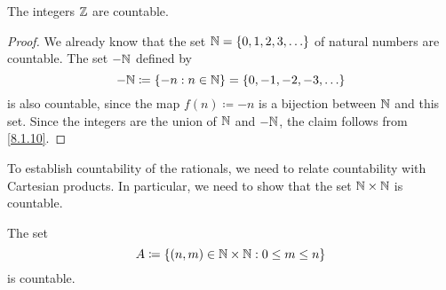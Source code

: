 \begin{cor}\label{8.1.11}
  The integers \(\mathbb{Z}\) are countable.
\end{cor}

\begin{proof}
  We already know that the set \(\N = \set{0, 1, 2, 3, \dots}\) of natural numbers are countable.
  The set \(-\mathbb{N}\) defined by
  \[
    -\N \coloneqq \set{-n : n \in \N} = \set{0, -1, -2, -3, \dots}
  \]
  is also countable, since the map \(f(n) \coloneqq -n\) is a bijection between \(\mathbb{N}\) and this set.
  Since the integers are the union of \(\mathbb{N}\) and \(-\mathbb{N}\), the claim follows from \cref{8.1.10}.
\end{proof}

\begin{note}
  To establish countability of the rationals, we need to relate countability with Cartesian products.
  In particular, we need to show that the set \(\mathbb{N} \times \mathbb{N}\) is countable.
\end{note}

\begin{lem}\label{8.1.12}
  The set
  \[
    A \coloneqq \left\lbrace(n, m) \in \mathbb{N} \times \mathbb{N} : 0 \leq m \leq n\right\rbrace
  \]
  is countable.
\end{lem}

